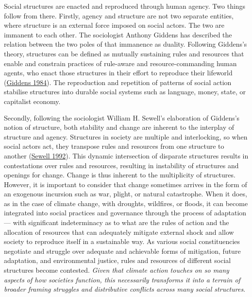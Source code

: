 \documentclass[a4paper, nobind]{templates/ociamthesis}
\begin{document}
Social structures are enacted and reproduced through human agency. Two things follow from there. Firstly, agency and structure are not two separate entities, where structure is an external force imposed on social actors. The two are immanent to each other. The sociologist Anthony Giddens has described the relation between the two poles of that immanence as duality. Following Giddens's theory, structures can be defined as mutually sustaining rules and resources that enable and constrain practices of rule-aware and resource-commanding human agents, who enact those structures in their effort to reproduce their lifeworld (\protect\hyperlink{ref-giddens_constitution_1984}{Giddens 1984}). The reproduction and repetition of patterns of social action stabilise structures into durable social systems such as language, money, state, or capitalist economy.

Secondly, following the sociologist William H. Sewell's elaboration of Giddens's notion of structure, both stability and change are inherent to the interplay of structure and agency. Structures in society are multiple and interlocking, so when social actors act, they transpose rules and resources from one structure to another (\protect\hyperlink{ref-sewell_theory_1992}{Sewell 1992}). This dynamic intersection of disparate structures results in contestations over rules and resources, resulting in instability of structures and openings for change. Change is thus inherent to the multiplicity of structures. However, it is important to consider that change sometimes arrives in the form of an exogenous incursion such as war, plight, or natural catastrophe. When it does, as in the case of climate change, with droughts, wildfires, or floods, it can become integrated into social practices and governance through the process of adaptation --- with significant indeterminacy as to what are the rules of action and the allocation of resources that can adequately mitigate external shock and allow society to reproduce itself in a sustainable way. As various social constituencies negotiate and struggle over adequate and achievable forms of mitigation, future adaptation, and environmental justice, rules and resources of different social structures become contested. \emph{Given that climate action touches on so many aspects of how societies function, this necessarily transforms it into a terrain of broader framing struggles and distributive conflicts across many social structures}.
\end{document}
